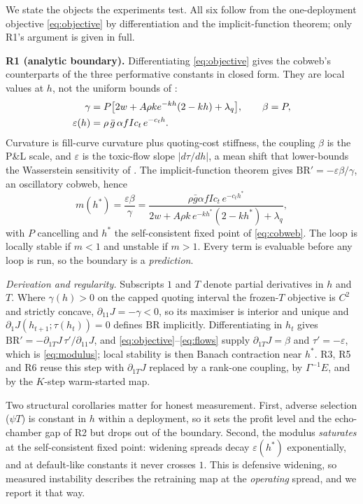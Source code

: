 \documentclass[sigconf,anonymous,review]{acmart}
\newcommand{\eps}{\varepsilon}
\newcommand{\BR}{\mathrm{BR}}
\newcommand{\gbar}{\bar{g}}
\begin{document}
We state the objects the experiments test. All six follow from the
one-deployment objective \eqref{eq:objective} by differentiation and the
implicit-function theorem; only R1's argument is given in full.

\textbf{R1 (analytic boundary).} Differentiating \eqref{eq:objective} gives
the cobweb's counterparts of the three performative constants in closed form.
They are local values at $h$, not the uniform bounds of
\cite{perdomo2020performative}:
\begin{align}
\gamma&=P\big[2w+A\rho k e^{-kh}(2-kh)+\lambda_q\big],\qquad \beta=P,
\notag\\
\eps(h)&=\rho\,\gbar\,\alpha f I c_t\,e^{-c_t h}.
\label{eq:constants}
\end{align}
Curvature is fill-curve curvature plus quoting-cost stiffness, the coupling
$\beta$ is the P\&L scale, and $\eps$ is the toxic-flow slope $|d\tau/dh|$, a
mean shift that lower-bounds the Wasserstein sensitivity of
\cite{perdomo2020performative}. The
implicit-function theorem gives $\BR'=-\eps\beta/\gamma$, an oscillatory
cobweb, hence
\begin{equation}
m(h^*)=\frac{\eps\beta}{\gamma}
=\frac{\rho\gbar\alpha f I c_t\,e^{-c_t h^*}}
       {2w+A\rho k\,e^{-k h^*}(2-k h^*)+\lambda_q},
\label{eq:modulus}
\end{equation}
with $P$ cancelling and $h^*$ the self-consistent fixed point of
\eqref{eq:cobweb}. The loop is locally stable if $m<1$ and unstable if
$m>1$. Every term is evaluable before any loop is run, so the boundary is a
\emph{prediction}.

\emph{Derivation and regularity.} Subscripts $1$ and $T$ denote partial
derivatives in $h$ and $T$. Where $\gamma(h)>0$ on the capped quoting interval
the frozen-$T$ objective is $C^2$ and strictly concave,
$\partial_{11}J=-\gamma<0$, so its maximiser is interior and unique and
$\partial_1 J(h_{t+1};\tau(h_t))=0$ defines $\BR$ implicitly. Differentiating
in $h_t$ gives $\BR'=-\partial_{1T}J\,\tau'/\partial_{11}J$, and
\eqref{eq:objective}--\eqref{eq:flows} supply $\partial_{1T}J=\beta$ and
$\tau'=-\eps$, which is \eqref{eq:modulus}; local stability is then Banach
contraction near $h^*$. R3, R5 and R6 reuse this step with $\partial_{1T}J$ replaced by a
rank-one coupling, by $\Gamma^{-1}E$, and by the $K$-step warm-started map.

Two structural corollaries matter for honest measurement. First, adverse
selection ($\psi T$) is constant in $h$ within a deployment, so it sets the
profit level and the echo-chamber gap of R2 but drops out of the boundary.
Second, the modulus \emph{saturates} at the self-consistent fixed point:
widening spreads decay $\eps(h^*)$ exponentially, and at default-like
constants it never crosses $1$. This is defensive widening, so measured
instability describes the retraining map at the \emph{operating} spread, and
we report it that way.
\end{document}
